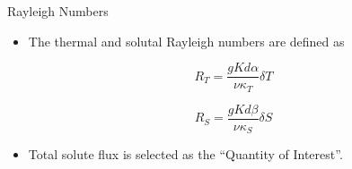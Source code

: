 \documentclass[compress,12pt]{beamer}
\newcommand{\bv}[1]{{\boldsymbol{#1}}}
\begin{document}
\begin{frame}{Rayleigh Numbers}
  \begin{itemize}

    \item The thermal and solutal
      Rayleigh numbers are defined as
  \end{itemize}
      
      \begin{equation}
	\nonumber
	R_T = \frac{ g  K  d \alpha }{\nu \kappa_T} \delta T
      \end{equation}	%
      
      \begin{equation}
	\nonumber
	R_S = \frac{ g   K  d \beta}{\nu  \kappa_S}  \delta S
      \end{equation}	%

      \begin{itemize}
      \item Total solute flux is selected as the ``Quantity of Interest''.
      \end{itemize}

      
\end{frame}
\end{document}
